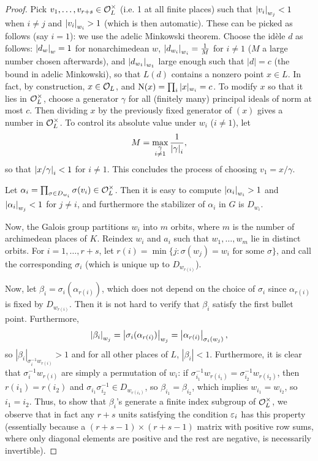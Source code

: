 \documentclass[11pt]{amsart}
\begin{document}
\begin{proof}
    Pick $v_1,\dots,v_{r+s}\in \mathcal{O}_L^\times$ (i.e. 1 at all finite places) such that $\left | v_i \right |_{w_j} < 1$ when $i\neq j$ and $\left | v_i \right |_{w_i} > 1$ (which is then automatic). These can be picked as follows (say $i=1$): we use the adelic Minkowski theorem. Choose the id\`ele $d$ as follows: $\left | d_w \right |_w = 1$ for nonarchimedean $w$, $\left | d_{w_i} \right |_{w_i} = \frac{1}{M}$ for $i\neq 1$ ($M$ a large number chosen afterwards), and $\left | d_{w_1} \right |_{w_1}$ large enough such that $|d| = c$ (the bound in adelic Minkowski), so that $L(d)$ contains a nonzero point $x \in L$. In fact, by construction, $x\in \mathcal{O}_L$, and $\operatorname{N}(x) = \prod_i |x|_{w_i} = c$. To modify $x$ so that it lies in $\mathcal{O}_L^\times$, choose a generator $\gamma$ for all (finitely many) principal ideals of norm at most $c$. Then dividing $x$ by the previously fixed generator of $(x)$ gives a number in $\mathcal{O}_L^\times$. To control its absolute value under $w_i$ ($i\neq 1$), let 
    \[M = \max_{\substack{\gamma \\ i\neq 1}} \frac{1}{\left | \gamma \right |_i},\]
    so that $\left | x/\gamma \right |_i < 1$ for $i\neq 1$. This concludes the process of choosing $v_1 = x/\gamma$.

    Let $\alpha_i = \prod_{\sigma\in D_{w_i}} \sigma(v_i) \in \mathcal{O}_L^\times$. Then it is easy to compute $\left | \alpha_i \right |_{w_i} > 1$ and $\left | \alpha_i \right |_{w_j} < 1$ for $j\neq i$, and furthermore the stabilizer of $\alpha_i$ in $G$ is $D_{w_i}$.

    Now, the Galois group partitions $w_i$ into $m$ orbits, where $m$ is the number of archimedean places of $K$. Reindex $w_i$ and $a_i$ such that $w_1,\dots,w_m$ lie in distinct orbits. For $i=1,\dots,r+s$, let $r(i) = \min\{j : \sigma(w_j) = w_i \text{ for some }\sigma\}$, and call the corresponding $\sigma_i$ (which is unique up to $D_{w_{r(i)}}$). 
    
    Now, let $\beta_i = \sigma_i(\alpha_{r(i)})$, which does not depend on the choice of $\sigma_i$ since $\alpha_{r(i)}$ is fixed by $D_{w_{r(i)}}$. Then it is not hard to verify that $\beta_i$ satisfy the first bullet point. Furthermore,
    \[\left | \beta_i \right |_{w_j} = \left | \sigma_i(\alpha_{r(i)}) \right |_{w_j} = \left | \alpha_{r(i)} \right |_{\sigma_i(w_j)},\]
    so $|\beta_i|_{\sigma_i^{-1}w_{r(i)}} > 1$ and for all other places of $L$, $|\beta_i|<1$. Furthermore, it is clear that $\sigma_i^{-1}w_{r(i)}$ are simply a permutation of $w_i$: if $\sigma_{i_1}^{-1}w_{r(i_1)} = \sigma_{i_2}^{-1}w_{r(i_2)}$, then $r(i_1)=r(i_2)$ and $\sigma_{i_1}\sigma_{i_2}^{-1}\in D_{w_{r(i_1)}}$, so $\beta_{i_1} = \beta_{i_2}$, which implies $w_{i_1} = w_{i_2}$, so $i_1 = i_2$.
    Thus, to show that $\beta_i$'s generate a finite index subgroup of $\mathcal{O}_L^\times$, we observe that in fact any $r+s$ units satisfying the condition $\varepsilon_i$ has this property (essentially because a $(r+s-1)\times (r+s-1)$ matrix with positive row sums, where only diagonal elements are positive and the rest are negative, is necessarily invertible).


\end{proof}
\end{document}
